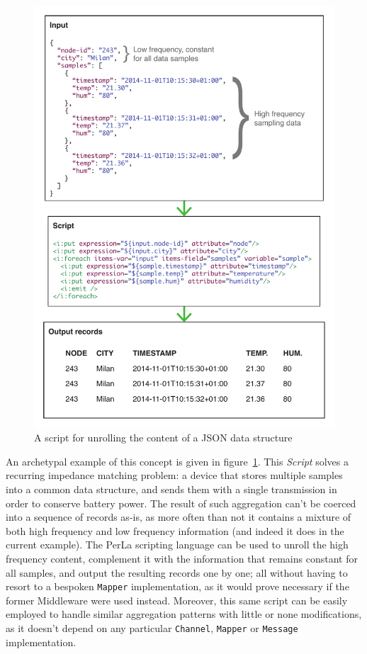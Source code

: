 \begin{figure}[h!]
    \centering
    \includegraphics[scale=0.8]{imgs/script_unrolling.pdf}
    \caption{A script for unrolling the content of a JSON data structure}
    \label{fig:script_unrolling}
\end{figure}

An archetypal example of this concept is given in
figure~\ref{fig:script_unrolling}. This \textit{Script} solves a recurring
impedance matching problem: a device that stores multiple samples into a common
data structure, and sends them with a single transmission in order to conserve
battery power. The result of such aggregation can't be coerced into a sequence
of records as-is, as more often than not it contains a mixture of both high
frequency and low frequency information (and indeed it does in the current
example). The PerLa scripting language can be used to unroll the high frequency
content, complement it with the information that remains constant for all
samples, and output the resulting records one by one; all without having to
resort to a bespoken \texttt{Mapper} implementation, as it would prove
necessary if the former Middleware were used instead. Moreover, this same
script can be easily employed to handle similar aggregation patterns with
little or none modifications, as it doesn't depend on any particular
\texttt{Channel}, \texttt{Mapper} or \texttt{Message} implementation.

